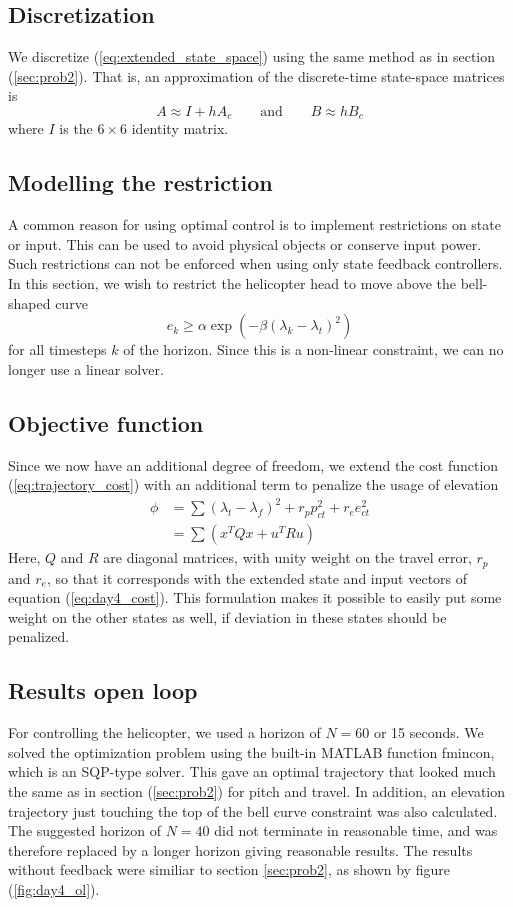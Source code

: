 \subsection{Discretization}
We discretize (\ref{eq:extended_state_space}) using the same method as in section (\ref{sec:prob2}). That is, an approximation of the discrete-time state-space matrices is
\begin{equation}
    A \approx I + hA_c
    \qquad\text{and}\qquad
    B \approx hB_c
\end{equation}
where $I$ is the $6\times6$ identity matrix.

\subsection{Modelling the restriction}
A common reason for using optimal control is to implement restrictions on state or input. This can be used to avoid physical objects or conserve input power. Such restrictions can not be enforced when using only state feedback controllers. In this section, we wish to restrict the helicopter head to move above the bell-shaped curve
\begin{equation}
    e_k \geq \alpha \exp (-\beta (\lambda_k - \lambda_t)^2 )
\end{equation}
for all timesteps $k$ of the horizon. Since this is a non-linear constraint, we can no longer use a linear solver.

\subsection{Objective function}
Since we now have an additional degree of freedom, we extend the cost function (\ref{eq:trajectory_cost}) with an additional term to penalize the usage of elevation
\begin{align}
    \phi &=\sum (\lambda_t - \lambda_f)^2 + r_{p}p_{ct}^2 + r_{e}e_{ct}^2 \\
         &=\sum(x^{T}Qx+u^{T}Ru)
\end{align}
Here, $Q$ and $R$ are diagonal matrices, with unity weight on the travel error, $r_p$ and $r_e$, so that it corresponds with the extended state and input vectors of equation (\ref{eq:day4_cost}). This formulation makes it possible to easily put some weight on the other states as well, if deviation in these states should be penalized.

\subsection{Results open loop}
For controlling the helicopter, we used a horizon of $N=60$ or 15 seconds. We solved the optimization problem using the built-in MATLAB function fmincon, which is an SQP-type solver. This gave an optimal trajectory that looked much the same as in section (\ref{sec:prob2}) for pitch and travel. In addition, an elevation trajectory just touching the top of the bell curve constraint was also calculated. The suggested horizon of $N=40$ did not terminate in reasonable time, and was therefore replaced by a longer horizon giving reasonable results. The results without feedback were similiar to section \ref{sec:prob2}, as shown by figure (\ref{fig:day4_ol}).

